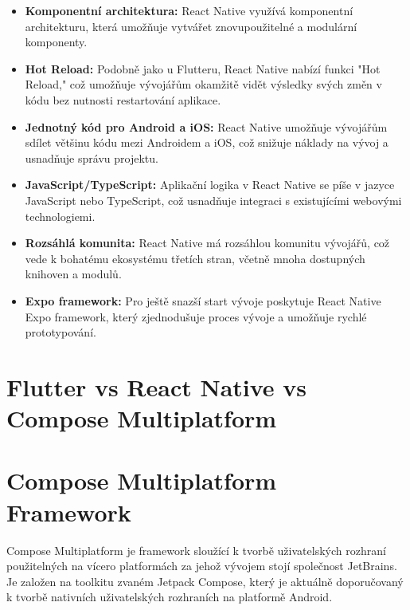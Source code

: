 \begin{itemize}
    \item \textbf{Komponentní architektura:} React Native využívá komponentní architekturu, která umožňuje vytvářet znovupoužitelné a modulární komponenty. 

    \item \textbf{Hot Reload:} Podobně jako u Flutteru, React Native nabízí funkci "Hot Reload," což umožňuje vývojářům okamžitě vidět výsledky svých změn v kódu bez nutnosti restartování aplikace.

    \item \textbf{Jednotný kód pro Android a iOS:} React Native umožňuje vývojářům sdílet většinu kódu mezi Androidem a iOS, což snižuje náklady na vývoj a usnadňuje správu projektu.

    \item \textbf{JavaScript/TypeScript:} Aplikační logika v React Native se píše v jazyce JavaScript nebo TypeScript, což usnadňuje integraci s existujícími webovými technologiemi.

    \item \textbf{Rozsáhlá komunita:} React Native má rozsáhlou komunitu vývojářů, což vede k bohatému ekosystému třetích stran, včetně mnoha dostupných knihoven a modulů.

    \item \textbf{Expo framework:} Pro ještě snazší start vývoje poskytuje React Native Expo framework, který zjednodušuje proces vývoje a umožňuje rychlé prototypování.

\end{itemize}

\section*{Flutter vs React Native vs Compose Multiplatform}




\section{Compose Multiplatform Framework}

Compose Multiplatform je framework sloužící k tvorbě uživatelských rozhraní použitelných na vícero platformách za 
jehož vývojem stojí společnost JetBrains. \cite{composeMultiplatform} Je založen na toolkitu zvaném Jetpack Compose, který je aktuálně 
doporučovaný k tvorbě nativních uživatelských rozhraních na platformě Android. \cite{jetpack}

